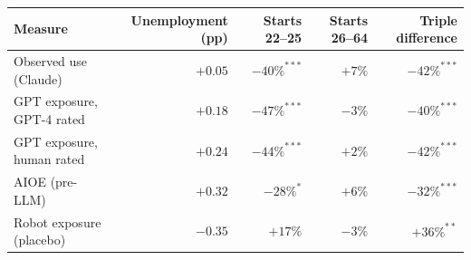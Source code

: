 \begin{tabular}{lrrrr}
\toprule
Measure & Unemployment (pp) & Starts 22--25 & Starts 26--64 & Triple difference \\
\midrule
Observed use (Claude) & $+0.05$ & $-40\%^{***}$ & $+7\%$ & $-42\%^{***}$ \\
GPT exposure, GPT-4 rated & $+0.18$ & $-47\%^{***}$ & $-3\%$ & $-40\%^{***}$ \\
GPT exposure, human rated & $+0.24$ & $-44\%^{***}$ & $+2\%$ & $-42\%^{***}$ \\
AIOE (pre-LLM) & $+0.32$ & $-28\%^{*}$ & $+6\%$ & $-32\%^{***}$ \\
Robot exposure (placebo) & $-0.35$ & $+17\%$ & $-3\%$ & $+36\%^{**}$ \\
\bottomrule
\end{tabular}
